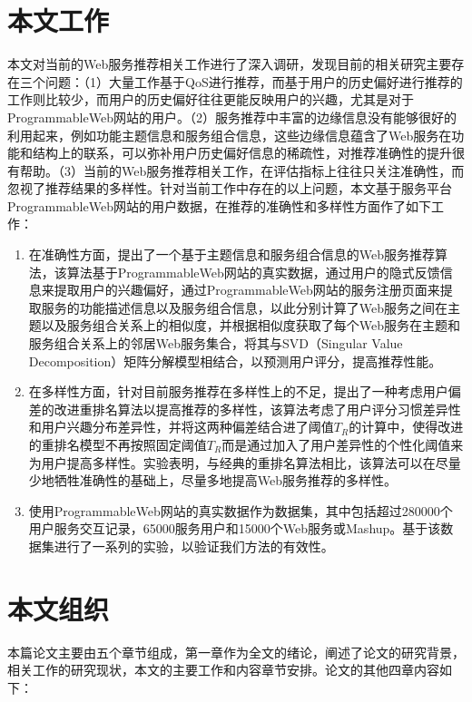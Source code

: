 \documentclass[master,winfonts]{njuthesis}
\begin{document}
\section{本文工作}
本文对当前的Web服务推荐相关工作进行了深入调研，发现目前的相关研究主要存在三个问题：（1）大量工作基于QoS进行推荐，而基于用户的历史偏好进行推荐的工作则比较少，而用户的历史偏好往往更能反映用户的兴趣，尤其是对于ProgrammableWeb网站的用户。（2）服务推荐中丰富的边缘信息没有能够很好的利用起来，例如功能主题信息和服务组合信息，这些边缘信息蕴含了Web服务在功能和结构上的联系，可以弥补用户历史偏好信息的稀疏性，对推荐准确性的提升很有帮助。（3）当前的Web服务推荐相关工作，在评估指标上往往只关注准确性，而忽视了推荐结果的多样性。针对当前工作中存在的以上问题，本文基于服务平台ProgrammableWeb网站的用户数据，在推荐的准确性和多样性方面作了如下工作：
\begin{enumerate}
\item 在准确性方面，提出了一个基于主题信息和服务组合信息的Web服务推荐算法，该算法基于ProgrammableWeb网站的真实数据，通过用户的隐式反馈信息来提取用户的兴趣偏好，通过ProgrammableWeb网站的服务注册页面来提取服务的功能描述信息以及服务组合信息，以此分别计算了Web服务之间在主题以及服务组合关系上的相似度，并根据相似度获取了每个Web服务在主题和服务组合关系上的邻居Web服务集合，将其与SVD（Singular Value Decomposition）矩阵分解模型相结合，以预测用户评分，提高推荐性能。

\item 在多样性方面，针对目前服务推荐在多样性上的不足，提出了一种考虑用户偏差的改进重排名算法以提高推荐的多样性，该算法考虑了用户评分习惯差异性和用户兴趣分布差异性，并将这两种偏差结合进了阈值$T_R$的计算中，使得改进的重排名模型不再按照固定阈值$T_R$而是通过加入了用户差异性的个性化阈值来为用户提高多样性。实验表明，与经典的重排名算法\cite{Adomavicius2009TOWARD}相比，该算法可以在尽量少地牺牲准确性的基础上，尽量多地提高Web服务推荐的多样性。

\item 使用ProgrammableWeb网站的真实数据作为数据集，其中包括超过280000个用户服务交互记录，65000服务用户和15000个Web服务或Mashup。基于该数据集进行了一系列的实验，以验证我们方法的有效性。
\end{enumerate}



\section{本文组织}
本篇论文主要由五个章节组成，第一章作为全文的绪论，阐述了论文的研究背景，相关工作的研究现状，本文的主要工作和内容章节安排。论文的其他四章内容如下：
\end{document}
